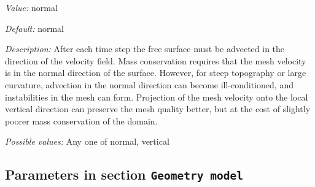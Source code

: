 \begin{itemize}
{\it Value:} normal


{\it Default:} normal


{\it Description:} After each time step the free surface must be advected in the direction of the velocity field. Mass conservation requires that the mesh velocity is in the normal direction of the surface. However, for steep topography or large curvature, advection in the normal direction can become ill-conditioned, and instabilities in the mesh can form. Projection of the mesh velocity onto the local vertical direction can preserve the mesh quality better, but at the cost of slightly poorer mass conservation of the domain.


{\it Possible values:} Any one of normal, vertical
\end{itemize}

\subsection{Parameters in section \tt Geometry model}
\label{parameters:Geometry_20model}

